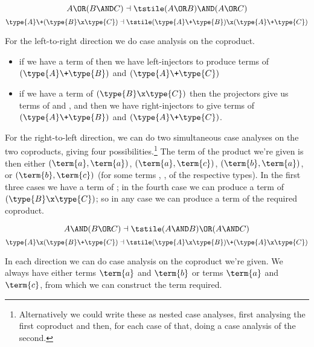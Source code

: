 \begin{Theorem}
\[
A \OR (B \AND C) \dashv \tstile (A \OR B) \AND (A \OR C)
\]
\[
\type{A} \+ (\type{B} \x \type{C}) \dashv \tstile (\type{A} \+ \type{B}) \x (\type{A} \+ \type{C})
\]
\end{Theorem}
\begin{Proof}
For the left-to-right direction we do case analysis on the coproduct.
\begin{itemize}
\item if we have a term of  then we have left-injectors to produce terms of $(\type{A} \+ \type{B})$ and $(\type{A} \+ \type{C})$
\item if we have a term of $(\type{B} \x \type{C})$ then the projectors give us terms of  and , and then we have right-injectors to give terms of $(\type{A} \+ \type{B})$ and $(\type{A} \+ \type{C})$.
\end{itemize}

For the right-to-left direction, we can do two simultaneous case analyses on the two coproducts, giving four possibilities.\footnote{
Alternatively we could write these as nested case analyses, first analysing the first coproduct and then, for each case of that, doing a case analysis of the second.
}
The term of the product we're given is then either $(\term{a},\term{a})$, $(\term{a},\term{c})$, $(\term{b},\term{a})$, or $(\term{b},\term{c})$  (for some terms , ,  of the respective types).  In the first three cases we have a term of ; in the fourth case we can produce a term of $(\type{B} \x \type{C})$; so in any case we can produce a term of the required coproduct.
\end{Proof}


\begin{Theorem}
\[
A \AND (B \OR C) \dashv \tstile (A \AND B) \OR (A \AND C)
\]
\[
\type{A} \x (\type{B} \+ \type{C}) \dashv \tstile (\type{A} \x \type{B}) \+ (\type{A} \x \type{C})
\]
\end{Theorem}
\begin{Proof}
In each direction we can do case analysis on the coproduct we're given.  We always have either terms $\term{a}$ and $\term{b}$ or terms $\term{a}$ and $\term{c}$, from which we can construct the term required.
\end{Proof}







